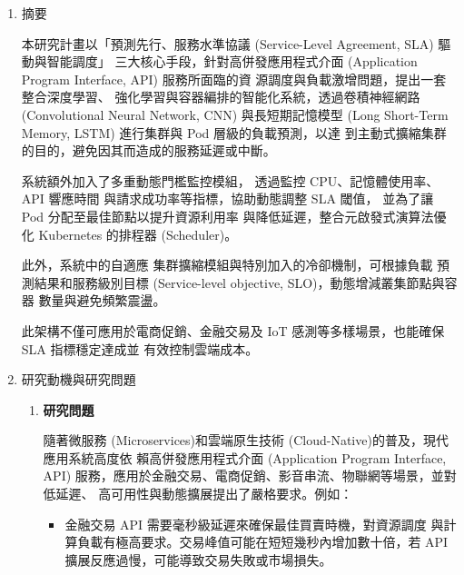 \documentclass[12pt,a4paper]{article}
\begin{document}
\setlength{\parindent}{2em}


\begin{enumerate}[label={(\zhdig*)}, leftmargin=2\parindent, listparindent=\parindent]

\item 摘要

本研究計畫以「預測先行、服務水準協議 (Service-Level Agreement, SLA) 驅動與智能調度」
三大核心手段，針對高併發應用程式介面 (Application Program Interface, API) 服務所面臨的資
源調度與負載激增問題，提出一套整合深度學習、
強化學習與容器編排的智能化系統，透過卷積神經網路 (Convolutional Neural Network, CNN)
與長短期記憶模型 (Long Short-Term Memory, LSTM) 進行集群與 Pod 層級的負載預測，以達
到主動式擴縮集群的目的，避免因其而造成的服務延遲或中斷。

系統額外加入了多重動態門檻監控模組，
透過監控 CPU、記憶體使用率、API 響應時間
與請求成功率等指標，協助動態調整 SLA 閾值，
並為了讓 Pod 分配至最佳節點以提升資源利用率
與降低延遲，整合元啟發式演算法優化
Kubernetes 的排程器 (Scheduler)。

此外，系統中的自適應
集群擴縮模組與特別加入的冷卻機制，可根據負載
預測結果和服務級別目標 (Service-level objective, SLO)，動態增減叢集節點與容器
數量與避免頻繁震盪。

此架構不僅可應用於電商促銷、金融交易及 IoT
感測等多樣場景，也能確保 SLA 指標穩定達成並
有效控制雲端成本。

\item 研究動機與研究問題

\begin{enumerate}[label={(\arabic*)}, leftmargin=\parindent, listparindent=\parindent]

\item\textbf{研究問題}

隨著微服務 (Microservices)\cite{1}和雲端原生技術
(Cloud-Native)\cite{2}的普及，現代應用系統高度依
賴高併發應用程式介面 (Application Program Interface, API)
服務，應用於金融交易、電商促銷、影音串流、物聯網等場景，並對 低延遲、
高可用性與動態擴展提出了嚴格要求。例如：

\begin{itemize}[leftmargin=\parindent, listparindent=\parindent]

\item 金融交易 API 需要毫秒級延遲來確保最佳買賣時機，對資源調度
與計算負載有極高要求。交易峰值可能在短短幾秒內增加數十倍，若 API
擴展反應過慢，可能導致交易失敗或市場損失。\cite{3}


\end{itemize}
\end{enumerate}
\end{enumerate}
\end{document}

